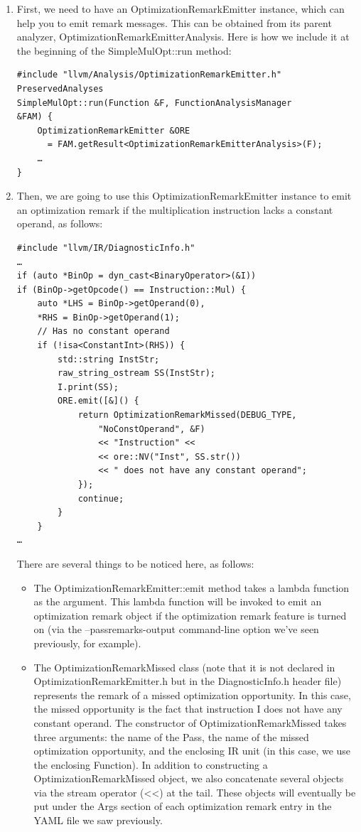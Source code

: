 \begin{enumerate}
\item First, we need to have an OptimizationRemarkEmitter instance, which can help you to emit remark messages. This can be obtained from its parent analyzer, OptimizationRemarkEmitterAnalysis. Here is how we include it at the beginning of the SimpleMulOpt::run method:

\begin{lstlisting}[style=styleCXX]
#include "llvm/Analysis/OptimizationRemarkEmitter.h"
PreservedAnalyses
SimpleMulOpt::run(Function &F, FunctionAnalysisManager
&FAM) {
	OptimizationRemarkEmitter &ORE
	  = FAM.getResult<OptimizationRemarkEmitterAnalysis>(F);
	…
}
\end{lstlisting}

\item Then, we are going to use this OptimizationRemarkEmitter instance to emit an optimization remark if the multiplication instruction lacks a constant operand, as follows:

\begin{lstlisting}[style=styleCXX]
#include "llvm/IR/DiagnosticInfo.h"
…
if (auto *BinOp = dyn_cast<BinaryOperator>(&I))
if (BinOp->getOpcode() == Instruction::Mul) {
	auto *LHS = BinOp->getOperand(0),
	*RHS = BinOp->getOperand(1);
	// Has no constant operand
	if (!isa<ConstantInt>(RHS)) {
		std::string InstStr;
		raw_string_ostream SS(InstStr);
		I.print(SS);
		ORE.emit([&]() {
			return OptimizationRemarkMissed(DEBUG_TYPE,
				"NoConstOperand", &F)
				<< "Instruction" <<
				<< ore::NV("Inst", SS.str())
				<< " does not have any constant operand";
			});
			continue;
		}
	}
…
\end{lstlisting}

There are several things to be noticed here, as follows:

\begin{itemize}
\item The OptimizationRemarkEmitter::emit method takes a lambda function as the argument. This lambda function will be invoked to emit an optimization remark object if the optimization remark feature is turned on (via the –passremarks-output command-line option we've seen previously, for example).

\item The OptimizationRemarkMissed class (note that it is not declared in
OptimizationRemarkEmitter.h but in the DiagnosticInfo.h header file) represents the remark of a missed optimization opportunity. In this case, the missed opportunity is the fact that instruction I does not have any constant operand. The constructor of OptimizationRemarkMissed takes three arguments: the name of the Pass, the name of the missed optimization opportunity, and the enclosing IR unit (in this case, we use the enclosing Function). In addition to constructing a OptimizationRemarkMissed object, we also concatenate several objects via the stream operator (<<) at the tail. These objects will eventually be put under the Args section of each optimization remark entry in the YAML file we saw previously.


\end{itemize}
\end{enumerate}
